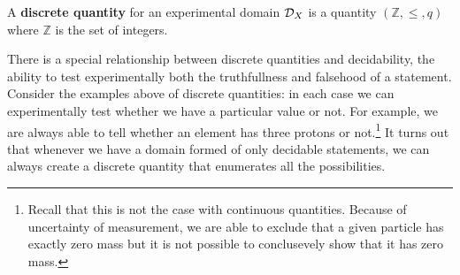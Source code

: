 \documentclass[11pt,letterpaper,fleqn]{memoir} %
\begin{document}
\begin{mathSection}
\begin{defn}
	A \textbf{discrete quantity} for an experimental domain $\mathcal{D}_X$ is a quantity $(\mathbb{Z}, \leq, q)$ where $\mathbb{Z}$ is the set of integers.
\end{defn}
\end{mathSection}

There is a special relationship between discrete quantities and decidability, the ability to test experimentally both the truthfullness and falsehood of a statement. Consider the examples above of discrete quantities: in each case we can experimentally test whether we have a particular value or not. For example, we are always able to tell whether an element has three protons or not.\footnote{Recall that this is not the case with continuous quantities. Because of uncertainty of measurement, we are able to exclude that a given particle has exactly zero mass but it is not possible to conclusevely show that it has zero mass.} It turns out that whenever we have a domain formed of only decidable statements, we can always create a discrete quantity that enumerates all the possibilities.
\end{document}
